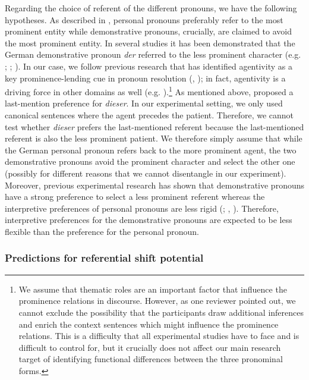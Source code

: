 \documentclass[output=paper,colorlinks,citecolor=brown]{langscibook}
\begin{document}
Regarding the choice of referent of the different pronouns, we have the following hypotheses. As described in , personal pronouns preferably refer to the most prominent entity while demonstrative pronouns, crucially, are claimed to avoid the most prominent entity. In several studies it has been demonstrated that the German demonstrative pronoun \textit{der} referred to the less prominent character (e.g. \citealt{BoschEtAl2003}; \citealt{BoschEtAl2007}; \citealt{HinterwimmerBosch2016}). In our case, we follow previous research that has identified agentivity as a key prominence-lending cue in pronoun resolution (\citealt{SchumacherEtAl2016}, \citeyear{SchumacherEtAl2017}); in fact, agentivity is a driving force in other domains as well (e.g. \citealt{KretzschmarEtAl2019}).\footnote{We assume that thematic roles are an important factor that influence the prominence relations in discourse. However, as one reviewer pointed out, we cannot exclude the possibility that the participants draw additional inferences and enrich the context sentences which might influence the prominence relations. This is a difficulty that all experimental studies have to face and is difficult to control for, but it crucially does not affect our main research target of identifying functional differences between the three pronominal forms.} As mentioned above, \citet{ZifonunEtAl1997} proposed a last-mention preference for \textit{dieser}. In our experimental setting, we only used canonical sentences where the agent precedes the patient. Therefore, we cannot test whether \textit{dieser} prefers the last-mentioned referent because the last-mentioned referent is also the less prominent patient. We therefore simply assume that while the German personal pronoun refers back to the more prominent agent, the two demonstrative pronouns avoid the prominent character and select the other one (possibly for different reasons that we cannot disentangle in our experiment). Moreover, previous experimental research has shown that demonstrative pronouns have a strong preference to select a less prominent referent whereas the interpretive preferences of personal pronouns are less rigid (\citealt{BoschEtAl2007}; \citealt{SchumacherEtAl2016}, \citeyear{SchumacherEtAl2017}). Therefore, interpretive preferences for the demonstrative pronouns are expected to be less flexible than the preference for the personal pronoun. 

\subsubsection{Predictions for referential shift potential}\label{sec:fuchs:1.4.2}
\end{document}
